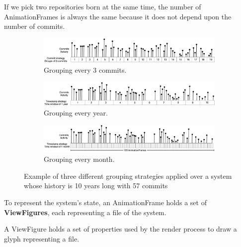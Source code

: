 If we pick two repositories born at the same time, the number of AnimationFrames is always the same because it does not depend upon the number of commits. 


\begin{figure}
    \begin{center}
        \begin{subfigure}{1\textwidth}
            \includegraphics[width=\linewidth]{TimeWindow1.jpg}
            \caption{Grouping every 3 commits.} 
            \label{fig:TimeWindow1}
        \end{subfigure}
        \begin{subfigure}{1\textwidth}
            \includegraphics[width=\linewidth]{TimeWindow2.jpg}
            \caption{Grouping every year.} 
            \label{fig:TimeWindow2}
        \end{subfigure}
        \begin{subfigure}{1\textwidth}
            \includegraphics[width=\linewidth]{TimeWindow3.jpg}
            \caption{Grouping every month.}
            \label{fig:TimeWindow3}
        \end{subfigure}
        \caption[Example of three different grouping strategies]{Example of three different grouping strategies applied over a system whose history is 10 years long with 57 commits}
        \label{fig:TimeWindowExamples}
    \end{center}
\end{figure}



To represent the system's state, an AnimationFrame holds a set of \textbf{ViewFigures}, each representing a file of the system.

A ViewFigure holds a set of properties used by the render process to draw a glyph representing a file. 


